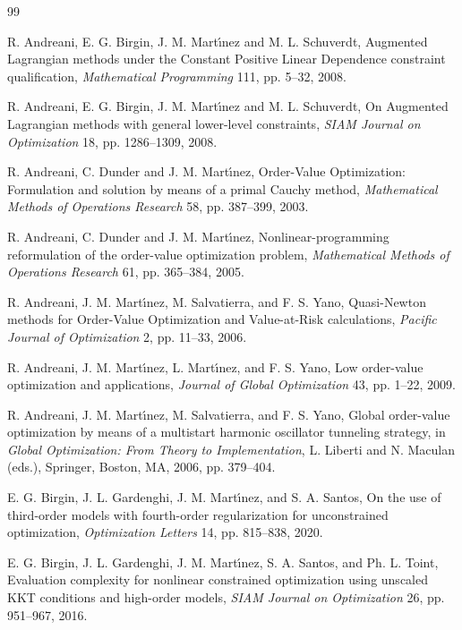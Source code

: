 \documentclass[11pt]{article}
\begin{document}
\begin{thebibliography}{99}

 R. Andreani, E. G. Birgin, J. M. Mart\'{\i}nez and M. L. Schuverdt, Augmented Lagrangian methods under the Constant Positive Linear Dependence constraint qualification, \textit{Mathematical Programming} 111, pp. 5--32, 2008.

 R. Andreani, E. G. Birgin, J. M. Mart\'{\i}nez and M. L. Schuverdt, On Augmented Lagrangian methods with general lower-level constraints, \textit{SIAM Journal on Optimization} 18, pp. 1286--1309, 2008.

 R. Andreani, C. Dunder and J. M. Mart\'{\i}nez, Order-Value Optimization: Formulation and solution by means of a primal Cauchy method, \textit{Mathematical Methods of Operations Research} 58, pp. 387--399, 2003.

 R. Andreani, C. Dunder and J. M. Mart\'{\i}nez, Nonlinear-programming reformulation of the order-value optimization problem, \textit{Mathematical Methods of Operations Research} 61, pp. 365--384, 2005.

 R. Andreani, J. M. Mart\'{\i}nez, M. Salvatierra, and F. S. Yano, Quasi-Newton methods for Order-Value Optimization and Value-at-Risk calculations, \textit{Pacific Journal of Optimization} 2, pp. 11--33, 2006.

 R. Andreani, J. M. Mart\'{\i}nez, L. Mart\'{\i}nez, and F. S. Yano, Low order-value optimization and applications, \textit{Journal of Global Optimization} 43, pp. 1--22, 2009.

 R. Andreani, J. M. Mart\'{\i}nez, M. Salvatierra, and F. S. Yano, Global order-value optimization by means of a multistart harmonic oscillator tunneling strategy, in \textit{Global Optimization: From Theory to Implementation}, L. Liberti and N. Maculan (eds.), Springer, Boston, MA, 2006, pp. 379--404.

 E. G. Birgin, J. L. Gardenghi, J. M. Mart\'{\i}nez, and S. A. Santos, On the use of third-order models with fourth-order regularization for unconstrained optimization, \textit{Optimization Letters} 14, pp. 815--838, 2020.

 E. G. Birgin, J. L. Gardenghi, J. M. Mart\'{\i}nez, S. A. Santos, and Ph. L. Toint, Evaluation complexity for nonlinear constrained optimization using unscaled KKT conditions and high-order models, \textit{SIAM Journal on Optimization} 26, pp. 951--967, 2016.


\end{thebibliography}
\end{document}
